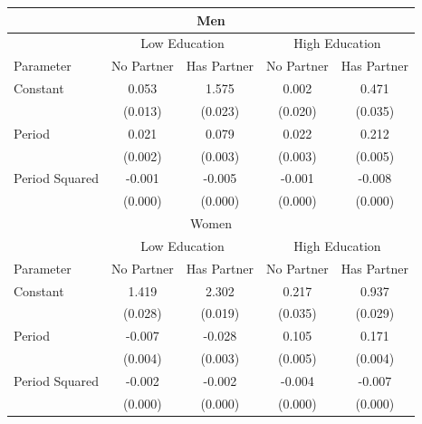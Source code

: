 \begin{tabular}{lcccc}
    \toprule
    \multicolumn{5}{c}{Men} \\
    \midrule
     & \multicolumn{2}{c}{Low Education} & \multicolumn{2}{c}{High Education} \\
    Parameter & No Partner & Has Partner & No Partner & Has Partner \\
    \midrule
    Constant & 0.053 & 1.575 & 0.002 & 0.471 \\
     & (0.013) & (0.023) & (0.020) & (0.035) \\
    Period & 0.021 & 0.079 & 0.022 & 0.212 \\
     & (0.002) & (0.003) & (0.003) & (0.005) \\
    Period Squared & -0.001 & -0.005 & -0.001 & -0.008 \\
     & (0.000) & (0.000) & (0.000) & (0.000) \\
    \midrule
    \multicolumn{5}{c}{Women} \\
    \midrule
     & \multicolumn{2}{c}{Low Education} & \multicolumn{2}{c}{High Education} \\
    Parameter & No Partner & Has Partner & No Partner & Has Partner \\
    \midrule
    Constant & 1.419 & 2.302 & 0.217 & 0.937 \\
     & (0.028) & (0.019) & (0.035) & (0.029) \\
    Period & -0.007 & -0.028 & 0.105 & 0.171 \\
     & (0.004) & (0.003) & (0.005) & (0.004) \\
    Period Squared & -0.002 & -0.002 & -0.004 & -0.007 \\
     & (0.000) & (0.000) & (0.000) & (0.000) \\
    \bottomrule
\end{tabular}
